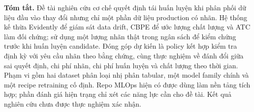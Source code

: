 \textbf{Tóm tắt.}
Đề tài nghiên cứu cơ chế quyết định tái huấn luyện khi phân phối dữ liệu đầu vào thay đổi nhưng chỉ một phần dữ liệu production có nhãn. Hệ thống kế thừa Evidently để giám sát data drift, CBPE để ước lượng chất lượng và ATC làm đối chứng; sử dụng một lượng nhãn thật trong ngân sách để kiểm chứng trước khi huấn luyện candidate. Đóng góp dự kiến là policy kết hợp kiểm tra định kỳ với yêu cầu nhãn theo bằng chứng, cùng thực nghiệm về đánh đổi giữa sai quyết định, chi phí nhãn, chi phí huấn luyện và chất lượng theo thời gian. Phạm vi gồm hai dataset phân loại nhị phân tabular, một model family chính và một recipe retraining cố định. Repo MLOps hiện có được dùng làm nền tảng tích hợp; phần đánh giá hiện trạng chỉ xét các năng lực cần cho đề tài. Kết quả nghiên cứu chưa được thực nghiệm xác nhận.
